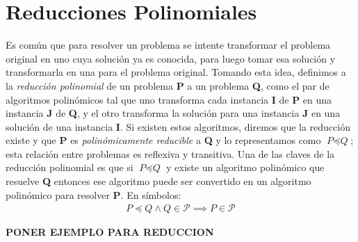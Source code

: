 \documentclass{article}
\begin{document}
\noindent{}

\section*{Reducciones Polinomiales}
\indent Es común que para resolver un problema se intente transformar el problema original en uno cuya solución ya es conocida, para luego tomar esa solución y transformarla en una para el problema original. Tomando esta idea, definimos a la \textit{reducción polinomial} de un problema \textbf{P} a un problema \textbf{Q}, como el par de algoritmos polinómicos tal que uno transforma cada instancia \textbf{I} de \textbf{P} en una instancia \textbf{J} de \textbf{Q}, y el otro transforma la solución para una instancia \textbf{J} en una solución de una instancia \textbf{I}. Si existen estos algoritmos, diremos que la reducción existe y que \textbf{P} es \textit{polinómicamente reducible} a \textbf{Q} y lo representamos como $\textit{P} \preceq \textit{Q}$; esta relación entre problemas es reflexiva y transitiva.\newline
\indent Una de las claves de la reducción polinomial es que si $\textit{P} \preceq \textit{Q}$ y existe un algoritmo polinómico que resuelve \textbf{Q} entonces ese algoritmo puede ser convertido en un algoritmo polinómico para resolver \textbf{P}. En símbolos:
\begin{align*}
    P \preceq Q \land Q \in \mathcal{P} \implies P \in \mathcal{P}
\end{align*}

\textbf{PONER EJEMPLO PARA REDUCCION}
\end{document}
